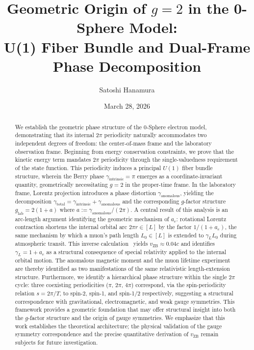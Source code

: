 \documentclass[%
 reprint,
 amsmath,amssymb,
 aps,
 prb,
]{revtex4-2}
\numberwithin{equation}{section}
\theoremstyle{definition}
\theoremstyle{remark}
\newcommand{\Uone}{U(1)}
\begin{document}
\title{Geometric Origin of $g = 2$ in the 0-Sphere Model:\\ U(1) Fiber Bundle and Dual-Frame Phase Decomposition}

\author{Satoshi Hanamura} 
\date{March 28, 2026}

\begin{abstract}
We establish the geometric phase structure of the 0-Sphere electron model, demonstrating that its internal 2$\pi$ periodicity naturally accommodates two independent degrees of freedom: the center-of-mass frame and the laboratory observation frame. Beginning from energy conservation constraints, we prove that the kinetic energy term mandates 2$\pi$ periodicity through the single-valuedness requirement of the state function. This periodicity induces a principal $\Uone$ fiber bundle structure, wherein the Berry phase $\gamma_{\text{intrinsic}} = \pi$ emerges as a coordinate-invariant quantity, geometrically necessitating $g = 2$ in the proper-time frame. In the laboratory frame, Lorentz projection introduces a phase distortion $\gamma_{\text{anomalous}}$, yielding the decomposition $\gamma_{\text{total}} = \gamma_{\text{intrinsic}} + \gamma_{\text{anomalous}}$ and the corresponding $g$-factor structure $g_{\text{lab}} = 2(1 + a)$ where $a := \gamma_{\text{anomalous}}/(2\pi)$. A central result of this analysis is an arc-length argument identifying the geometric mechanism of $a_e$: rotational Lorentz contraction shortens the internal orbital arc $2\pi r \in [L]$ by the factor $1/(1+a_e)$, the same mechanism by which a muon's path length $L_0 \in [L]$ is extended to $\gamma_L L_0$ during atmospheric transit. This inverse calculation~\cite{Hanamura_2026_35} yields $v_{\text{ZB}} \approx 0.04c$ and identifies $\gamma_L = 1+a_e$ as a structural consequence of special relativity applied to the internal orbital motion. The anomalous magnetic moment and the muon lifetime experiment are thereby identified as two manifestations of the same relativistic length-extension structure. Furthermore, we identify a hierarchical phase structure within the single $2\pi$ cycle: three coexisting periodicities ($\pi$, $2\pi$, $4\pi$) correspond, via the spin-periodicity relation $s = 2\pi/T$, to spin-2, spin-1, and spin-1/2 respectively, suggesting a structural correspondence with gravitational, electromagnetic, and weak gauge symmetries. This framework provides a geometric foundation that may offer structural insight into both the $g$-factor structure and the origin of gauge symmetries. We emphasize that this work establishes the theoretical architecture; the physical validation of the gauge symmetry correspondence and the precise quantitative derivation of $v_{\text{ZB}}$ remain subjects for future investigation.
\end{abstract}
\end{document}
